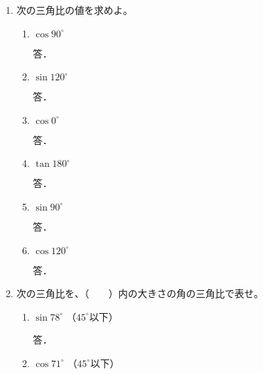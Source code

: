 \documentclass[b4paper,twocolumn]{jsarticle}
\begin{document}
\newpage


\begin{enumerate}
\item 次の三角比の値を求めよ。

\begin{enumerate}
\item $\cos 90^\circ $
\vfill

\hfill 答．\underline{\hspace{50truemm}}

\item $\sin 120^\circ $
\vfill

\hfill 答．\underline{\hspace{50truemm}}

\item $\cos 0^\circ $
\vfill

\hfill 答．\underline{\hspace{50truemm}}

\item $\tan 180^\circ $
\vfill

\hfill 答．\underline{\hspace{50truemm}}

\item $\sin 90^\circ $
\vfill

\hfill 答．\underline{\hspace{50truemm}}

\item $\cos 120^\circ $
\vfill

\hfill 答．\underline{\hspace{50truemm}}

\end{enumerate}

\item 次の三角比を、（　　）内の大きさの角の三角比で表せ。

\begin{enumerate}
\item $\sin 78^\circ$ \hfill （$45^\circ$以下） \hspace{30truemm}
\vfill

\hfill 答．\underline{\hspace{50truemm}}

\item $\cos 71^\circ$ \hfill （$45^\circ$以下） \hspace{30truemm}
\vfill


\end{enumerate}
\end{enumerate}
\end{document}
